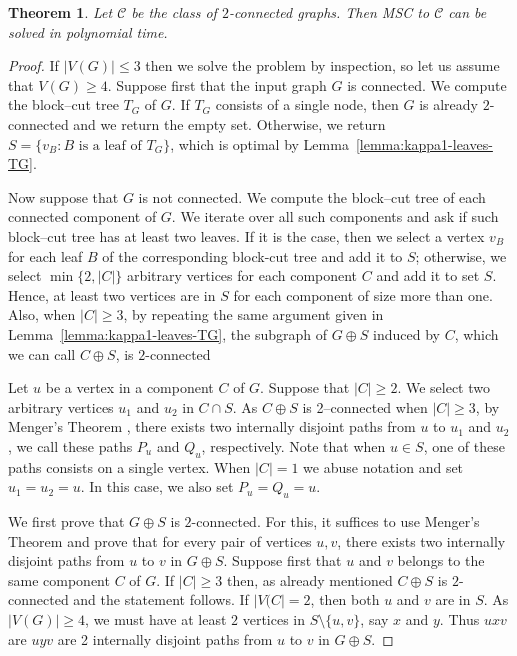 \documentclass[11pt]{article}
\newtheorem{theorem}{Theorem}
\theoremstyle{definition}
\begin{document}
\begin{theorem}
\label{thm:to-2conn}
Let $\mathcal{C}$ be the class of $2$-connected graphs.  
Then MSC to $\mathcal{C}$ can be solved in polynomial time.
\end{theorem}

\begin{proof}
If $|V(G)| \leq 3$ then we solve the problem by inspection, so let us assume that $V(G) \geq 4$.
Suppose first that the input graph $G$ is connected.
We compute the block--cut tree $T_G$ of $G$.
If $T_G$ consists of a single node, then $G$ is already $2$-connected and we return the empty set.
Otherwise, we return
$S=\{v_B : B \text{ is a leaf of } T_G\}$,
which is optimal by Lemma~\ref{lemma:kappa1-leaves-TG}.

Now suppose that $G$ is not connected.
We compute the block--cut tree of each connected component of $G$.
We iterate over all such components and ask if such 
block--cut tree has at least two leaves.
If it is the case, then we select a vertex $v_B$ for each leaf $B$ of the corresponding block-cut tree and add it to $S$; otherwise,
we select $\min \{2,|C|\}$ arbitrary vertices for each component $C$ and add it to set $S$.
Hence, at least two vertices are in $S$ for each component of size more than one.
Also, when $|C| \geq 3$, by repeating the same argument given in Lemma~\ref{lemma:kappa1-leaves-TG}, the subgraph of $G \oplus S$ induced by $C$, which we can call $C \oplus S$, is $2$-connected 

Let $u$ be a vertex in a component $C$ of $G$.
Suppose that $|C|\geq 2$. We select two arbitrary vertices $u_1$ and $u_2$ in $C \cap S$.
As $C \oplus S$ is 2--connected when $|C|\geq 3$, by Menger's Theorem \cite{BondyM08}, there exists two internally disjoint paths from $u$ to $u_1$ and $u_2$, we call these paths $P_u$ and $Q_u$, respectively.
Note that when $u \in S$, one of these paths consists on a single vertex.
When $|C|=1$ we abuse notation and set $u_1=u_2=u$.
In this case, we also set $P_u=Q_u=u$.

We first prove that $G \oplus S$ is $2$-connected.
For this, it suffices to use Menger's Theorem \cite{BondyM08} and prove that for every pair of vertices $u,v$, there exists two internally disjoint paths from $u$ to $v$ in $G \oplus S$.
Suppose first that $u$ and $v$ belongs to the same component $C$ of $G$.
If $|C| \geq 3$ then, as already mentioned $C \oplus S$
is $2$-connected and the statement follows. If $|V(C| = 2$, then both $u$ and $v$ are in $S$.
As $|V(G)| \geq 4$, we must have at least $2$ vertices in $S\setminus \{u,v\}$, say $x$ and $y$. Thus $uxv$ are $uyv$ are 2 internally disjoint paths from $u$ to $v$ in $G \oplus S$.


\end{proof}
\end{document}
